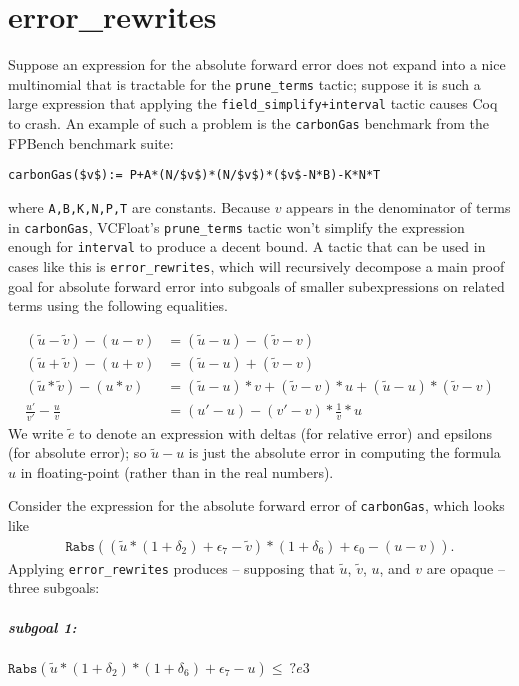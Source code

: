 \documentclass[article]{memoir}
\begin{document}
\chapter{error\_rewrites} Suppose an expression for the absolute
forward error does not expand into a nice multinomial
that is tractable for the \lstinline{prune_terms} tactic;
suppose it is such a large expression
that applying the \lstinline{field_simplify+interval} 
tactic causes Coq to crash. An example
of such a problem is the \lstinline{carbonGas} benchmark from the
FPBench benchmark suite:
\begin{lstlisting} 
carbonGas($v$):= P+A*(N/$v$)*(N/$v$)*($v$-N*B)-K*N*T
\end{lstlisting}
where \lstinline{A,B,K,N,P,T} are constants. Because $v$ 
appears in the denominator of terms in \lstinline{carbonGas},
VCFloat's \lstinline{prune_terms} tactic won't simplify the 
expression enough for \lstinline{interval} to produce a decent 
bound. A tactic that can be used in cases like this is 
\lstinline{error_rewrites}, which will recursively
decompose a main proof goal for absolute forward error into 
subgoals of smaller subexpressions on related terms using the 
following equalities.  
 
\begin{align*}
 (\tilde{u} - \tilde{v}) - (u-v) &= (\tilde{u} - u) -
(\tilde{v} - v) \\
 (\tilde{u} + \tilde{v}) - (u+v) &= (\tilde{u} - u) +
(\tilde{v} - v) \\ 
(\tilde{u} * \tilde{v}) - (u*v) &= (\tilde{u} - u)*v +
(\tilde{v} - v)*u + (\tilde{u} - u)*(\tilde{v} - v) \\
\frac{u'}{v'} - \frac{u}{v} &= (u'-u) - (v'-v) * \frac{1}{v} * 
u
\end{align*}
We write $\tilde{e}$ to denote an expression with 
deltas (for relative error) and epsilons (for absolute error); 
so $\tilde{u} - u$ is just the absolute error in computing the 
formula $u$ in floating-point (rather than in the real numbers).

Consider the expression for the absolute
forward error of \lstinline{carbonGas}, which looks like 
\begin{align*}
 \texttt{Rabs}((\tilde{u}*(1+\delta_2) + \epsilon_7 - 
 \tilde{v}) * (1 + \delta_6) + \epsilon_0 - (u - v)).
\end{align*}
Applying \lstinline{error_rewrites}
produces -- supposing that $\tilde{u}$, $\tilde{v}$, $u$, and 
$v$ are 
opaque -- three subgoals:
\paragraph{subgoal 1:}$\texttt{Rabs} (\tilde{u}*(1+\delta_2)*(1 
+ \delta_6) + 
\epsilon_7 -  u) \le \ ?e3$
\end{document}
